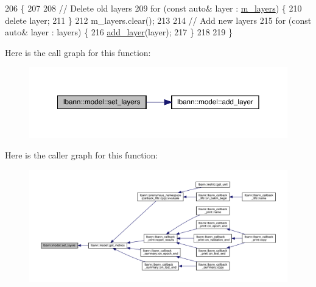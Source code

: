 \begin{DoxyCode}
206                                                 \{
207 
208   \textcolor{comment}{// Delete old layers}
209   \textcolor{keywordflow}{for} (\textcolor{keyword}{const} \textcolor{keyword}{auto}& layer : \hyperlink{classlbann_1_1model_a0229fc226ec163d1411548446104569d}{m\_layers}) \{
210     \textcolor{keyword}{delete} layer;
211   \}
212   m\_layers.clear();
213 
214   \textcolor{comment}{// Add new layers}
215   \textcolor{keywordflow}{for} (\textcolor{keyword}{const} \textcolor{keyword}{auto}& layer : layers) \{
216     \hyperlink{classlbann_1_1model_a5dfa9895024f07d273062b67d7a0dc01}{add\_layer}(layer);
217   \}
218 
219 \}
\end{DoxyCode}
Here is the call graph for this function\+:\nopagebreak
\begin{figure}[H]
\begin{center}
\leavevmode
\includegraphics[width=350pt]{classlbann_1_1model_a95fb74f678f69b763d51b2ce987c8fde_cgraph}
\end{center}
\end{figure}
Here is the caller graph for this function\+:\nopagebreak
\begin{figure}[H]
\begin{center}
\leavevmode
\includegraphics[width=350pt]{classlbann_1_1model_a95fb74f678f69b763d51b2ce987c8fde_icgraph}
\end{center}
\end{figure}
\mbox{\label{classlbann_1_1model_a5bafc4e84671490c6118959becb22e16}} 
